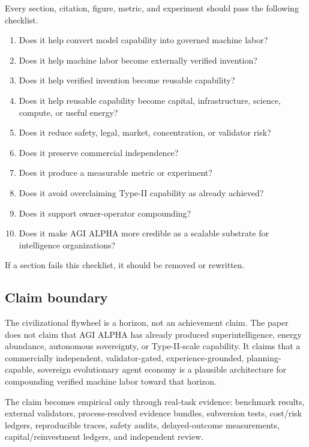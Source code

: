 Every section, citation, figure, metric, and experiment should pass the
following checklist.

\begin{enumerate}
\def\labelenumi{\arabic{enumi}.}
\tightlist
\item
  Does it help convert model capability into governed machine labor?
\item
  Does it help machine labor become externally verified invention?
\item
  Does it help verified invention become reusable capability?
\item
  Does it help reusable capability become capital, infrastructure,
  science, compute, or useful energy?
\item
  Does it reduce safety, legal, market, concentration, or validator
  risk?
\item
  Does it preserve commercial independence?
\item
  Does it produce a measurable metric or experiment?
\item
  Does it avoid overclaiming Type-II capability as already achieved?
\item
  Does it support owner-operator compounding?
\item
  Does it make AGI ALPHA more credible as a scalable substrate for
  intelligence organizations?
\end{enumerate}

If a section fails this checklist, it should be removed or rewritten.

\subsection{Claim boundary}\label{claim-boundary}

The civilizational flywheel is a horizon, not an achievement claim. The
paper does not claim that AGI ALPHA has already produced
superintelligence, energy abundance, autonomous sovereignty, or
Type-II-scale capability. It claims that a commercially independent,
validator-gated, experience-grounded, planning-capable, sovereign
evolutionary agent economy is a plausible architecture for compounding
verified machine labor toward that horizon.

The claim becomes empirical only through real-task evidence: benchmark
results, external validators, process-resolved evidence bundles,
subversion tests, cost/risk ledgers, reproducible traces, safety audits,
delayed-outcome measurements, capital/reinvestment ledgers, and
independent review.

